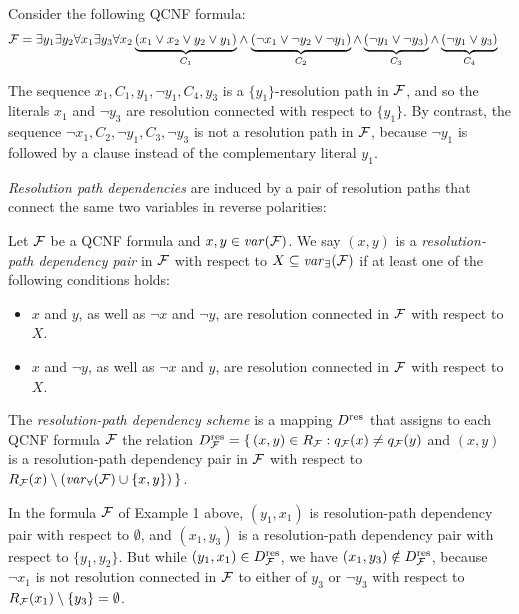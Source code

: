 \documentclass{llncs}
\newcommand{\longversion}[1]{#1}
\newcommand{\shortversion}[1]{}
\newcommand{\Dres}{D^{\text{\normalfont res}}}
\def\hy{\hbox{-}\nobreak\hskip0pt} \newcommand{\ellipsis}{$\dots$}
\newcommand{\SB}{\{\,} \newcommand{\SM}{\;{:}\;} \newcommand{\SE}{\,\}}
\begin{document}
\begin{example}\label{ex:running} \longversion{Consider the following QCNF formula:
\begin{align*}
    \FFF = \exists y_1 \exists y_2 \forall x_1 \exists y_3 \forall x_2
    \underbrace{(x_1 \vee x_2 \vee y_2 \vee y_1)}_{C_1} &\wedge
    \underbrace{(\neg x_1 \vee \neg y_2 \vee \neg y_1 )}_{C_2} \shortversion{\\ &}\wedge
    \underbrace{(\neg y_1 \vee \neg y_3)}_{C_3} \wedge \underbrace{(\neg y_1
      \vee y_3)}_{C_4}
  \end{align*}} 
\shortversion{Let $\FFF = \exists y_1 \exists y_2 \forall x_1 \exists y_3
  \forall x_2\: C_1 \wedge C_2 \wedge C_3 \wedge C_4$, where $C_1 = (x_1 \vee
  x_2 \vee y_2 \vee y_1),$ \hskip 0pt $ C_2 = (\neg x_1 \vee \neg y_2 \vee \neg
  y_1 ),$ \hskip 0pt $ C_3= (\neg y_1 \vee \neg y_3)$, and $C_4 = (\neg y_1 \vee
  y_3)$.}

The sequence $x_1,C_1,y_1,\neg y_1,C_4, y_3$ is a $\{ y_1 \}$\hy resolution
path in $\mathcal{F}$, and so the literals $x_1$ and $\neg y_3$ are resolution connected
with respect to $\{ y_1 \}$. By contrast, the sequence $\neg x_1, C_2, \neg
y_1, C_3, \neg y_3$ is not a resolution path in $\mathcal{F}$, because $\neg y_1$ is
followed by a clause instead of the complementary literal $y_1$.
\end{example}
\emph{Resolution path dependencies} are induced by a pair of resolution paths
that connect the same two variables in reverse polarities:
\begin{definition} Let $\mathcal{F}$ be a QCNF formula and
  $x, y \in \mathit{var}(\mathcal{F})$. We say $(x,y)$ is a \textit{resolution\hy
    path dependency pair} in $\mathcal{F}$ with respect to $X \subseteq
  \mathit{var}_{\exists}(\mathcal{F})$ if at least one of the following conditions
  holds:
  \begin{itemize}
  \item $x$ and $y$, as well as $\neg x$ and $\neg y$, are resolution connected in
    $\mathcal{F}$ with respect to $X$.
  \item $x$ and $\neg y$, as well as $\neg x$ and $y$, are resolution connected in
    $\mathcal{F}$ with respect to $X$.
  \end{itemize}
\end{definition}

\begin{definition}[Resolution\hy path dependency scheme]
  \label{def:resdep} The \textit{resolution\hy path dependency scheme} is a
  mapping $\Dres$ that assigns to each QCNF formula $\mathcal{F}$ the relation
  $\Dres_{\FFF} = \SB (x,y) \in R_{\FFF} \SM q_{\FFF}(x) \neq q_{\FFF}(y)$ and
  $(x,y)$ is a resolution\hy path dependency pair in $\mathcal{F}$ with respect to
  $R_{\FFF}(x) \setminus (\var_{\forall}(\FFF) \cup \{x,y\}) \SE$.
\end{definition}
In the formula $\mathcal{F}$ of Example 1 above, $(y_1,x_1)$ is resolution\hy path
dependency pair with respect to $\emptyset$, and $(x_1,y_3)$ is a
resolution\hy path dependency pair with respect to $\{y_1,y_2\}$. But while
$(y_1,x_1) \in \Dres_{\FFF}$, we have $(x_1,y_3) \notin \Dres_{\FFF}$, because
$\neg x_1$ is not resolution connected in $\mathcal{F}$ to either of $y_3$ or $\neg
y_3$ with respect to $R_{\mathcal{F}}(x_1) \setminus \{y_3 \} = \emptyset$.
\end{document}
